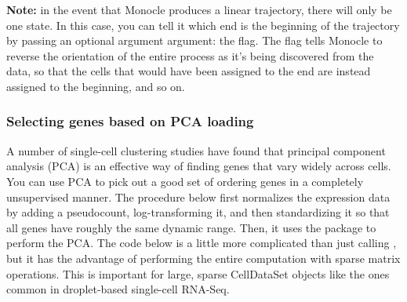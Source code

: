 \documentclass[10pt,oneside]{article}\usepackage[]{graphicx}\usepackage[]{color}
\begin{document}
\textbf{Note:} in the event that Monocle produces a linear trajectory, there will only
be one state. In this case, you can tell it which end is the beginning of the 
trajectory by passing  an optional argument argument: the 
 flag. The  flag tells Monocle to reverse the 
orientation of the entire process as it's being discovered from the data, 
so that the cells that would have been assigned to the end are instead assigned 
to the beginning, and so on.  

\subsubsection{Selecting genes based on PCA loading}

A number of single-cell clustering studies have found that principal component
analysis (PCA) is an effective way of finding genes that vary widely across cells. You 
can use PCA to pick out a good set of ordering genes in a completely unsupervised
manner. The procedure below first normalizes the expression data by adding a 
pseudocount, log-transforming it, and then standardizing it so that all genes
have roughly the same dynamic range.  Then, it uses the  package
to perform the PCA. The code below is a little more complicated than just calling
, but it has the advantage of performing the entire computation
with sparse matrix operations. This is important for large, sparse CellDataSet 
objects like the ones common in droplet-based single-cell RNA-Seq.
\end{document}

